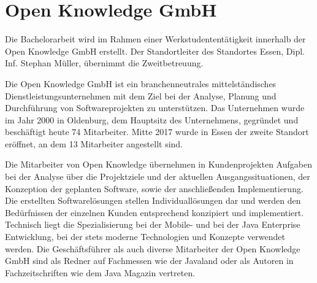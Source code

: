 


\section{Open Knowledge GmbH}


Die Bachelorarbeit wird im Rahmen einer Werkstudententätigkeit innerhalb der Open Knowledge GmbH erstellt. Der Standortleiter des Standortes Essen, Dipl. Inf. Stephan Müller, übernimmt die Zweitbetreuung.

Die Open Knowledge GmbH ist ein branchenneutrales mittelständisches Dienstleistungsunternehmen mit dem Ziel bei der Analyse, Planung und Durchführung von Softwareprojekten zu unterstützen. Das Unternehmen wurde im Jahr 2000 in Oldenburg, dem Hauptsitz des Unternehmens, gegründet und beschäftigt heute 74 Mitarbeiter. Mitte 2017 wurde in Essen der zweite Standort eröffnet, an dem 13 Mitarbeiter angestellt sind.

Die Mitarbeiter von Open Knowledge übernehmen in Kundenprojekten Aufgaben bei der Analyse über die Projektziele und der aktuellen Ausgangssituationen, der Konzeption der geplanten Software, sowie der anschließenden Implementierung. Die erstellten Softwarelösungen stellen Individuallösungen dar und werden den Bedürfnissen der einzelnen Kunden entsprechend konzipiert und implementiert. Technisch liegt die Spezialisierung bei der Mobile- und bei der Java Enterprise Entwicklung, bei der stets moderne Technologien und Konzepte verwendet werden. Die Geschäftsführer als auch diverse Mitarbeiter der Open Knowledge GmbH sind als Redner auf Fachmessen wie der Javaland oder als Autoren in Fachzeitschriften wie dem Java Magazin vertreten. %

